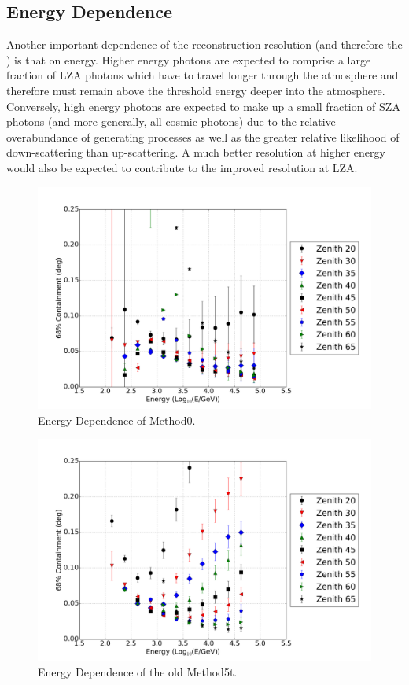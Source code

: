\documentclass[main.tex]{subfiles}
\begin{document}
\subsection{Energy Dependence}
Another important dependence of the reconstruction resolution (and therefore the \rse) is that on energy. Higher energy photons are expected to comprise a large fraction of LZA photons which have to travel longer through the atmosphere and therefore must remain above the threshold energy deeper into the atmosphere. Conversely, high energy photons are expected to make up a small fraction of SZA photons (and more generally, all cosmic photons) due to the relative overabundance of generating processes as well as the greater relative likelihood of down-scattering than up-scattering. A much better resolution at higher energy would also be expected to contribute to the improved resolution at LZA.

\begin{figure}[htbp]
  \centering
  \includegraphics[width=.9\linewidth]{images/reg_energy}
  \caption{Energy Dependence of Method0.}
  \label{fig:energy_reg}
\end{figure}

\begin{figure}[htbp]
  \centering
  \includegraphics[width=.9\linewidth]{images/disp_standard_energy}
  \caption{Energy Dependence of the old Method5t.}
  \label{fig:energy_disp_standard}    
\end{figure}
\end{document}
